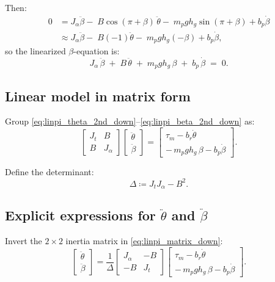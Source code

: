 \documentclass[12pt,a4paper]{article}
\begin{document}
Then:
\begin{align*}
0
&=
J_\alpha\ddot\beta
-\;B\cos(\pi+\beta)\,\ddot\theta
-\;m_p g h_g\sin(\pi+\beta)
+b_p\dot\beta\\
&\approx
J_\alpha\ddot\beta
-\;B(-1)\ddot\theta
-\;m_p g h_g(-\beta)
+b_p\dot\beta,
\end{align*}
so the linearized $\beta$-equation is:
\begin{equation}
\boxed{
J_\alpha\,\ddot\beta \;+\; B\,\ddot\theta \;+\; m_p g h_g\,\beta \;+\; b_p\,\dot\beta \;=\; 0.
}
\label{eq:linpi_beta_2nd_down}
\end{equation}

\subsection{Linear model in matrix form}

Group \eqref{eq:linpi_theta_2nd_down}--\eqref{eq:linpi_beta_2nd_down} as:
\begin{equation}
\boxed{
\begin{bmatrix}
J_t & B\\
B & J_\alpha
\end{bmatrix}
\begin{bmatrix}
\ddot\theta\\
\ddot\beta
\end{bmatrix}
=
\begin{bmatrix}
\tau_m - b_r\dot\theta\\
-\,m_p g h_g\,\beta - b_p\dot\beta
\end{bmatrix}.
}
\label{eq:linpi_matrix_down}
\end{equation}

Define the determinant:
\[
\Delta \coloneqq J_tJ_\alpha - B^2.
\]

\subsection{Explicit expressions for $\ddot\theta$ and $\ddot\beta$}

Invert the $2\times2$ inertia matrix in \eqref{eq:linpi_matrix_down}:
\[
\begin{bmatrix}
\ddot\theta\\
\ddot\beta
\end{bmatrix}
=
\frac{1}{\Delta}
\begin{bmatrix}
J_\alpha & -B\\
-B & J_t
\end{bmatrix}
\begin{bmatrix}
\tau_m - b_r\dot\theta\\
-\,m_p g h_g\,\beta - b_p\dot\beta
\end{bmatrix}.
\]
\end{document}
